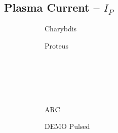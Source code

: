 \clearpage

\newpage

\subsection*{ Plasma Current -- $I_P$ }
  \label{subsection:scan_I_P}

\begin{figure*}[h!]
    \centering
    \hfill
    \begin{subfigure}[t]{0.45\textwidth}
        \centering
    \begin{adjustbox}{width=\textwidth}
      \Large
      
    \end{adjustbox}
        \caption{Charybdis}
    \end{subfigure}
    \hfill
    \begin{subfigure}[t]{0.45\textwidth}
        \centering
    \begin{adjustbox}{width=\textwidth}
      \Large
      
    \end{adjustbox}
        \caption{Proteus}
    \end{subfigure}
    \hfill \hfill ~\\ ~\\ ~\\ ~\\
    \hfill
    \begin{subfigure}[t]{0.45\textwidth}
        \centering
    \begin{adjustbox}{width=\textwidth}
      \Large
      
    \end{adjustbox}
        \caption{ARC}
    \end{subfigure}
    \hfill
    \begin{subfigure}[t]{0.45\textwidth}
        \centering
    \begin{adjustbox}{width=\textwidth}
      \Large
      
    \end{adjustbox}
        \caption{DEMO Pulsed}
    \end{subfigure}
    \hfill \hfill ~\\ ~\\ ~\\ ~\\
    \hfill
    \begin{subfigure}[t]{0.45\textwidth}
        \centering
    \begin{adjustbox}{width=\textwidth}

\end{adjustbox}
\end{subfigure}
\end{figure*}
